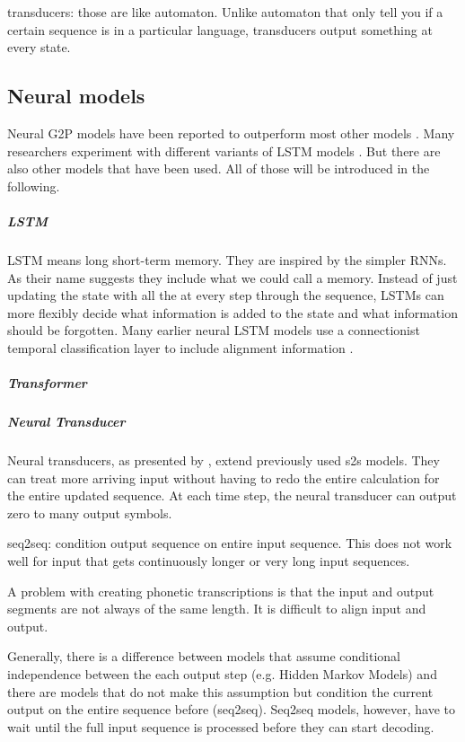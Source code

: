 
transducers: those are like automaton. Unlike automaton that only tell you if a certain sequence is in a particular language, transducers output something at every state. 

\subsection{Neural models}
Neural G2P models have been reported to outperform most other models \citep{Lee&Ashby.2020}. Many researchers experiment with different variants of LSTM models \citep{Lee&Ashby.2020, hammond-2021-data, gautam.2021, Rao2015GraphemetophonemeCU}. But there are also other models that have been used. All of those will be introduced in the following.

\subparagraph{LSTM}
LSTM means long short-term memory. They are inspired by the simpler RNNs. As their name suggests they include what we could call a memory. Instead of just updating the state with all the at every step through the sequence, LSTMs can more flexibly decide what information is added to the state and what information should be forgotten.
Many earlier neural LSTM models use a connectionist temporal classification layer to include alignment information \citep{lo-nicolai-2021-linguistic}. 

\subparagraph{Transformer}

\subparagraph{Neural Transducer}
Neural transducers, as presented by \citet{jaitly2016neural}, extend previously used \ac{s2s} models. They can treat more arriving input without having to redo the entire calculation for the entire updated sequence. At each time step, the neural transducer can output zero to many output symbols. 


seq2seq: condition output sequence on entire input sequence. This does not work well for input that gets continuously longer or very long input sequences. 


A problem with creating phonetic transcriptions is that the input and output segments are not always of the same length. It is difficult to align input and output. 


Generally, there is a difference between models that assume conditional independence between the each output step (e.g. Hidden Markov Models) and there are models that do not make this assumption but condition the current output on the entire sequence before (seq2seq). Seq2seq models, however, have to wait until the full input sequence is processed before they can start decoding. 




